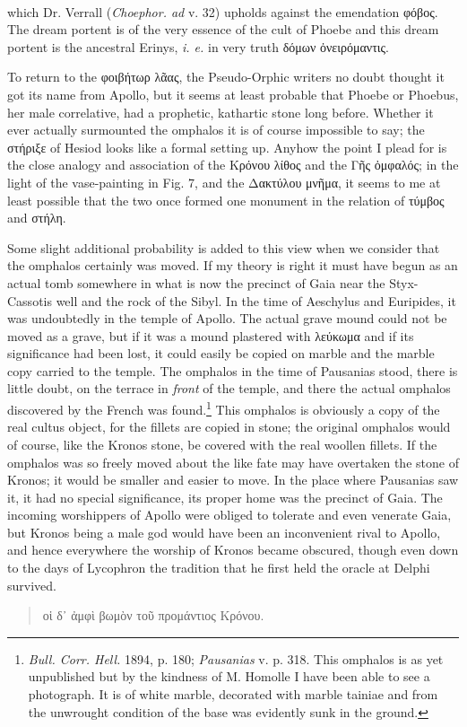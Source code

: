 \documentclass[a4paper, 11pt, oneside, polutonikogreek, english]{article}
\begin{document}
\paragraph{}
which Dr. Verrall (\emph{Choephor. ad} v. 32) upholds against the emendation φόβος. The dream portent is of the very essence of the cult of Phoebe and this dream portent is the ancestral Erinys, \emph{i. e.} in very truth δόμων ὀνειρόμαντις.

To return to the φοιβήτωρ λᾶας, the Pseudo-Orphic writers no doubt thought it got its name from Apollo, but it seems at least probable that Phoebe or Phoebus, her male correlative, had a prophetic, kathartic stone long before. Whether it ever actually surmounted the omphalos it is of course impossible to say; the στήριξε of Hesiod looks like a formal setting up. Anyhow the point I plead for is the close analogy and association of the Κρόνου λίθος and the Γῆς ὀμφαλός; in the light of the vase-painting in Fig. 7, and the Δακτύλου μνῆμα, it seems to me at least possible that the two once formed one monument in the relation of τύμβος and στήλη.

Some slight additional probability is added to this view when we consider that the omphalos certainly was moved. If my theory is right it must have begun as an actual tomb somewhere in what is now the precinct of Gaia near the Styx-Cassotis well and the rock of the Sibyl. In the time of Aeschylus and Euripides, it was undoubtedly in the temple of Apollo. The actual grave mound could not be moved as a grave, but if it was a mound plastered with λεύκωμα and if its significance had been lost, it could easily be copied on marble and the marble copy carried to the temple. The omphalos in the time of Pausanias stood, there is little doubt, on the terrace in \emph{front} of the temple, and there the actual omphalos discovered by the French was found.\footnote{\emph{Bull. Corr. Hell.} 1894, p. 180; \emph{Pausanias} v. p. 318. This omphalos is as yet unpublished but by the kindness of M. Homolle I have been able to see a photograph. It is of white marble, decorated with marble tainiae and from the unwrought condition of the base was evidently sunk in the ground.} This omphalos is obviously a copy of the real cultus object, for the fillets are copied in stone; the original omphalos would of course, like the Kronos stone, be covered with the real woollen fillets. If the omphalos was so freely moved about the like fate may have overtaken the stone of Kronos; it would be smaller and easier to move. In the place where Pausanias saw it, it had no special significance, its proper home was the precinct of Gaia. The incoming worshippers of Apollo were obliged to tolerate and even venerate Gaia, but Kronos being a male god would have been an inconvenient rival to Apollo, and hence everywhere the worship of Kronos became obscured, though even down to the days of Lycophron the tradition that he first held the oracle at Delphi survived.
\begin{quotation}
οἱ δ᾽ ἀμφὶ βωμὸν τοῦ προμάντιος Κρόνου.
\end{quotation}
\end{document}
